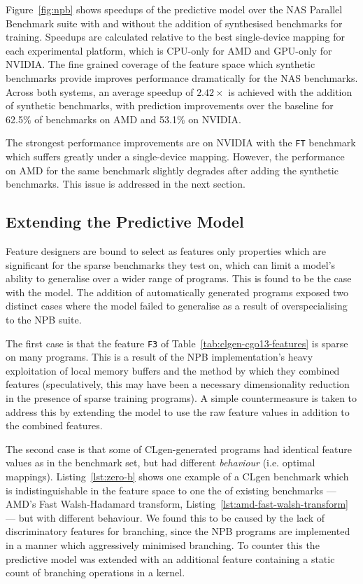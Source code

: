 Figure~\ref{fig:npb} shows speedups of the \citeauthor{Grewe2013} predictive model over the NAS Parallel Benchmark suite with and without the addition of synthesised benchmarks for training. Speedups are calculated relative to the best single-device mapping for each experimental platform, which is CPU-only for AMD and GPU-only for NVIDIA. The fine grained coverage of the feature space which synthetic benchmarks provide improves performance dramatically for the NAS benchmarks. Across both systems, an average speedup of $2.42\times$ is achieved with the addition of synthetic benchmarks, with prediction improvements over the baseline for 62.5\% of benchmarks on AMD and 53.1\% on NVIDIA.

The strongest performance improvements are on NVIDIA with the \texttt{FT} benchmark which suffers greatly under a single-device mapping. However, the performance on AMD for the same benchmark slightly degrades after adding the synthetic benchmarks. This issue is addressed in the next section.

\subsection{Extending the Predictive Model}
\label{subsec:eval-extended}

Feature designers are bound to select as features only properties which are significant for the sparse benchmarks they test on, which can limit a model's ability to generalise over a wider range of programs. This is found to be the case with the \citeauthor{Grewe2013} model. The addition of automatically generated programs exposed two distinct cases where the model failed to generalise as a result of overspecialising to the NPB suite.

The first case is that the feature \texttt{F3} of Table~\ref{tab:clgen-cgo13-features} is sparse on many programs. This is a result of the NPB implementation's heavy exploitation of local memory buffers and the method by which they combined features (speculatively, this may have been a necessary dimensionality reduction in the presence of sparse training programs). A simple countermeasure is taken to address this by extending the model to use the raw feature values in addition to the combined features.

The second case is that some of CLgen-generated programs had identical feature values as in the benchmark set, but had different \emph{behaviour} (i.e. optimal mappings). Listing~\ref{lst:zero-b} shows one example of a CLgen benchmark which is indistinguishable in the feature space to one the of existing benchmarks --- AMD's Fast Walsh-Hadamard transform, Listing~\ref{lst:amd-fast-walsh-transform} --- but with different behaviour. We found this to be caused by the lack of discriminatory features for branching, since the NPB programs are implemented in a manner which aggressively minimised branching. To counter this the predictive model was extended with an additional feature containing a static count of branching operations in a kernel.

